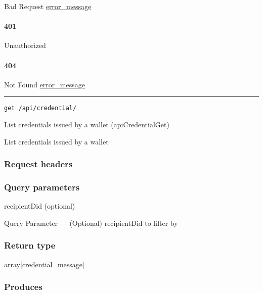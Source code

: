Bad Request \protect\hyperlink{error_message}{error\_message}

\hypertarget{section-186}{%
\paragraph{401}\label{section-186}}

Unauthorized \protect\hyperlink{}{}

\hypertarget{section-187}{%
\paragraph{404}\label{section-187}}

Not Found \protect\hyperlink{error_message}{error\_message}

\begin{center}\rule{0.5\linewidth}{\linethickness}\end{center}

\protect\hypertarget{apiCredentialGet}{}{}

\begin{verbatim}
get /api/credential/
\end{verbatim}

List credentials issued by a wallet ({apiCredentialGet})

List credentials issued by a wallet

\hypertarget{request-headers-31}{%
\subsubsection{Request headers}\label{request-headers-31}}

\hypertarget{query-parameters-1}{%
\subsubsection{Query parameters}\label{query-parameters-1}}

recipientDid (optional)

{Query Parameter} --- (Optional) recipientDid to filter by

\hypertarget{return-type-46}{%
\subsubsection{Return type}\label{return-type-46}}

array{[}\protect\hyperlink{credential_message}{credential\_message}{]}

\hypertarget{produces-57}{%
\subsubsection{Produces}\label{produces-57}}

